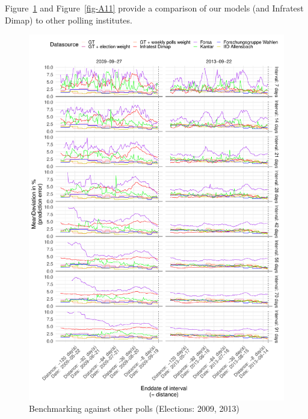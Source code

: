 \documentclass[
  letterpaper,
  DIV=11,
  numbers=noendperiod]{scrartcl}
\begin{document}
Figure~\ref{fig-A10} and Figure~\ref{fig-A11} provide a comparison of
our models (and Infratest Dimap) to other polling institutes.

\begin{figure}[H]

\caption{\label{fig-A10}Benchmarking against other polls (Elections:
2009, 2013)}

{\centering \includegraphics{figures/fig-A10-1.pdf}

}

\end{figure}
\end{document}
